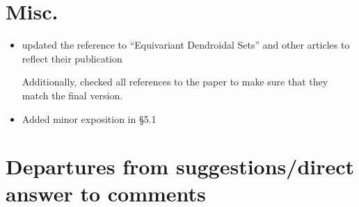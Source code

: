 \documentclass{article}
\begin{document}
\section{Misc.}


\begin{itemize}
\item updated the reference to ``Equivariant Dendroidal Sets'' and other articles to reflect their publication

      Additionally, checked all references to the paper to make sure that they match the final version.
\item Added minor exposition in \S 5.1
\end{itemize}


\section{Departures from suggestions/direct answer to comments}
\end{document}
